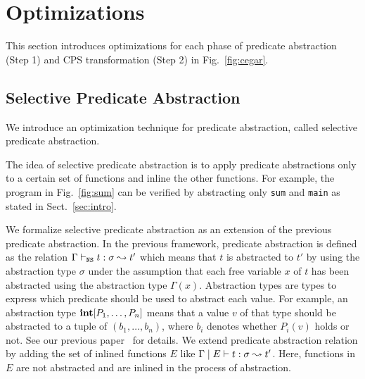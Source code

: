 
\section{Optimizations}
\label{sec:opt}

This section introduces optimizations for each phase of predicate
abstraction (Step 1) and CPS transformation (Step 2) in Fig.~\ref{fig:cegar}.

\subsection{Selective Predicate Abstraction}

We introduce an optimization technique for predicate abstraction, called
selective predicate abstraction.

The idea of selective predicate abstraction is to apply predicate
abstractions only to a certain set of functions and inline the other
functions.  For example, the program in Fig.~\ref{fig:sum} can
be verified by abstracting only \texttt{sum} and \texttt{main} as stated
in Sect.~\ref{sec:intro}.

We formalize selective predicate abstraction as an extension of the
previous predicate abstraction.  In the previous framework, predicate
abstraction is defined as the relation
${\Gamma} \vdash_{\texttt{NS}} {t} : {\sigma} \leadsto {t'}$ which means that $t$ is abstracted to
$t'$ by using the abstraction type $\sigma$ under the assumption that
each free variable $x$ of $t$ has been abstracted using the abstraction
type $\Gamma(x)$.  Abstraction types are types to express which
predicate should be used to abstract each value.  For example, an
abstraction type $\mathbf{int}[P_1,\dots,P_n]$ means that a value
$v$ of that type should be abstracted to a tuple of $(b_1,\dots,b_n)$,
where $b_i$ denotes whether $P_i(v)$ holds or not.  See our previous
paper~\cite{KobayashiPLDI2011} for details.  We extend predicate
abstraction relation by adding the set of inlined functions $E$ like
${\Gamma} \mid {E} \vdash {t} : {\sigma} \leadsto {t'}$.  Here, functions in $E$ are not
abstracted and are inlined in the process of abstraction.

